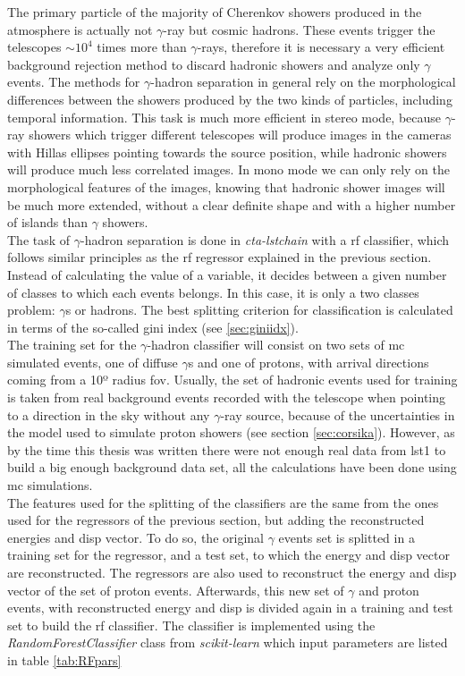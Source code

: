 \documentclass[main.tex]{subfiles}
\begin{document}
The primary particle of the majority of Cherenkov showers produced in the atmosphere is actually not $\gamma$-ray but cosmic hadrons. These events trigger the telescopes $\sim 10^4$ times more than $\gamma$-rays, therefore it is necessary a very efficient background rejection method to discard hadronic showers and analyze only $\gamma$ events. The methods for $\gamma$-hadron separation in general rely on the morphological differences between the showers produced by the two kinds of particles, including temporal information. This task is much more efficient in stereo mode, because $\gamma$-ray showers which trigger different telescopes will produce images in the cameras with Hillas ellipses pointing towards the source position, while hadronic showers will produce much less correlated images. In mono mode we can only rely on the morphological features of the images, knowing that hadronic shower images will be much more extended, without a clear definite shape and with a higher number of islands than $\gamma$ showers.\\
The task of $\gamma$-hadron separation is done in \textit{cta-lstchain} with a \gls{rf} classifier, which follows similar principles as the \gls{rf} regressor explained in the previous section. Instead of calculating the value of a variable, it decides between a given number of classes to which each events belongs. In this case, it is only a two classes problem: $\gamma$s or hadrons. The best splitting criterion for classification is calculated in terms of the so-called gini index (see \ref{sec:giniidx}).\\
The training set for the $\gamma$-hadron classifier will consist on two sets of \gls{mc} simulated events, one of diffuse $\gamma$s and one of protons, with arrival directions coming from a 10º radius \gls{fov}. Usually, the set of hadronic events used for training is taken from real background events recorded with the telescope when pointing to a direction in the sky without any $\gamma$-ray source, because of the uncertainties in the model used to simulate proton showers (see section \ref{sec:corsika}). However, as by the time this thesis was written there were not enough real data from \gls{lst}1 to build a big enough background data set, all the calculations have been done using \gls{mc} simulations.\\
The features used for the splitting of the classifiers are the same from the ones used for the regressors of the previous section, but adding the reconstructed energies and disp vector. To do so, the original $\gamma$ events set is splitted in a training set for the regressor, and a test set, to which the energy and disp vector are reconstructed. The regressors are also used to reconstruct the energy and disp vector of the set of proton events. Afterwards, this new set of $\gamma$ and proton events, with reconstructed energy and disp is divided again in a training and test set to build the \gls{rf} classifier.
The classifier is implemented using the \textit{RandomForestClassifier} class from \textit{scikit-learn} which input parameters are listed in table \ref{tab:RFpars}
\end{document}
